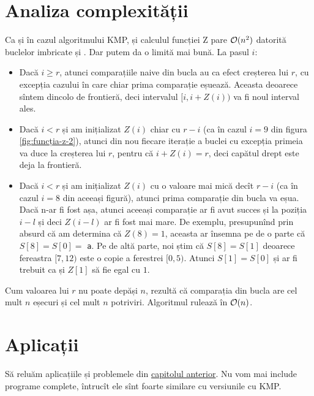 \documentclass[../main.tex]{subfiles}
\begin{document}
\section{Analiza complexității}

Ca și în cazul algoritmului KMP, și calculul funcției Z pare $\mathcal{O}(n^2)$ datorită buclelor imbricate  și . Dar putem da o limită mai bună. La pasul $i$:

\begin{itemize}
  \item Dacă $i \geq r$, atunci comparațiile naive din bucla  au ca efect creșterea lui $r$, cu excepția cazului în care chiar prima comparație eșuează. Aceasta deoarece sîntem dincolo de frontieră, deci intervalul $[i, i + Z(i))$ va fi noul interval ales.

  \item Dacă $i < r$ și am inițializat $Z(i)$ chiar cu $r - i$ (ca în cazul $i = 9$ din figura \ref{fig:funcția-z-2}), atunci din nou fiecare iterație a buclei  cu excepția primeia va duce la creșterea lui $r$, pentru că $i + Z(i) = r$, deci capătul drept este deja la frontieră.

  \item Dacă $i < r$ și am inițializat $Z(i)$ cu o valoare mai mică decît $r - i$ (ca în cazul $i = 8$ din aceeași figură), atunci prima comparație din bucla  va eșua. Dacă n-ar fi fost așa, atunci aceeași comparație ar fi avut succes și la poziția $i - l$ și deci $Z(i - l)$ ar fi fost mai mare. De exemplu, presupunînd prin absurd că am determina că $Z(8) = 1$, aceasta ar însemna pe de o parte că $S[8] = S[0] = $ \texttt{a}. Pe de altă parte, noi știm că $S[8] = S[1]$ deoarece fereastra $[7, 12)$ este o copie a ferestrei $[0, 5)$. Atunci $S[1] = S[0]$ și ar fi trebuit ca și $Z[1]$ să fie egal cu $1$.
\end{itemize}

Cum valoarea lui $r$ nu poate depăși $n$, rezultă că comparația din bucla  are cel mult $n$ eșecuri și cel mult $n$ potriviri. Algoritmul rulează în $\mathcal{O}(n)$.


\section{Aplicații}

Să reluăm aplicațiile și problemele din \hyperref[chapter:kmp]{capitolul anterior}. Nu vom mai include programe complete, întrucît ele sînt foarte similare cu versiunile cu KMP.
\end{document}
